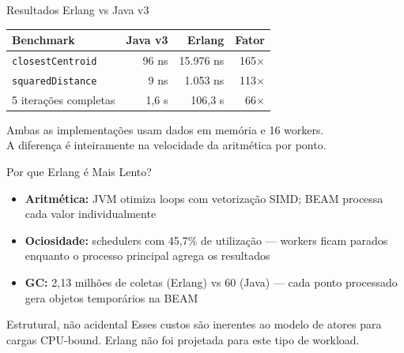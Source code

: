 \begin{frame}{Resultados Erlang vs Java v3}
    \begin{center}
    \begin{tabular}{lrrr}
        \toprule
        \textbf{Benchmark} & \textbf{Java v3} & \textbf{Erlang} & \textbf{Fator} \\
        \midrule
        \texttt{closestCentroid} & 96 ns & 15.976 ns & \alert{165$\times$} \\
        \texttt{squaredDistance} & 9 ns  &  1.053 ns & \alert{113$\times$} \\
        5 iterações completas    & 1,6 s & 106,3 s   & \alert{66$\times$} \\
        \bottomrule
    \end{tabular}
    \end{center}

    \vspace{0.8em}
    Ambas as implementações usam dados em memória e 16 workers. \\
    A diferença é inteiramente na \alert{velocidade da aritmética por ponto}.
\end{frame}

\begin{frame}{Por que Erlang é Mais Lento?}
    \begin{itemize}
        \item \textbf{Aritmética:} JVM otimiza loops com vetorização SIMD; BEAM processa cada valor individualmente
        \item \textbf{Ociosidade:} schedulers com \alert{45,7\%} de utilização --- workers ficam parados enquanto o processo principal agrega os resultados
        \item \textbf{GC:} \alert{2,13 milhões} de coletas (Erlang) vs \alert{60} (Java) --- cada ponto processado gera objetos temporários na BEAM
    \end{itemize}

    \vspace{0.8em}
    \begin{block}{Estrutural, não acidental}
        Esses custos são inerentes ao modelo de atores para cargas CPU-bound.
        Erlang não foi projetada para este tipo de workload.
    \end{block}
\end{frame}
